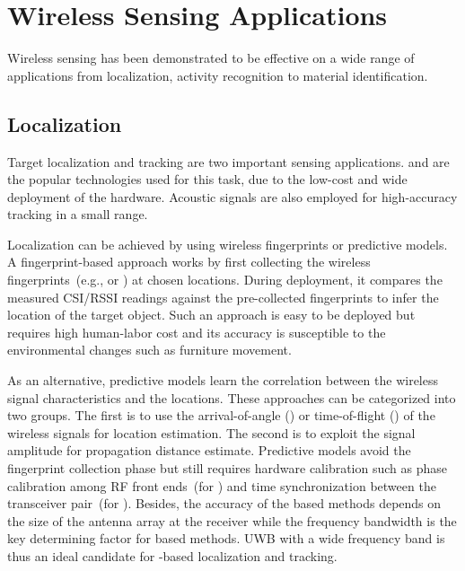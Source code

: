 \section{Wireless Sensing Applications}
Wireless sensing has been demonstrated to be effective on a wide range of applications from localization, activity recognition to material
identification.


\subsection{Localization} Target localization and tracking are two important sensing applications. \WiFi and \RFID are the popular technologies used for this task, due to the low-cost and wide deployment of the hardware.
Acoustic signals are also employed for high-accuracy tracking in a small range. %

Localization can be achieved by using wireless fingerprints or predictive models. A fingerprint-based approach works
by first collecting the wireless fingerprints~(e.g., \RSSI or \CSI) at chosen locations. During deployment, it compares the measured CSI/RSSI readings against the pre-collected fingerprints to infer the
location of the target object. Such an approach is easy to be deployed but requires high human-labor cost and its accuracy is susceptible to the environmental changes such as furniture movement.

As an alternative, predictive models learn the correlation between the wireless signal characteristics and the  locations. These
approaches can be categorized into two groups. The first is to use the arrival-of-angle (\AoA) or time-of-flight (\ToF) of the wireless
signals for location estimation. The second is to exploit the signal amplitude for propagation distance estimate. Predictive models avoid the fingerprint collection phase but still requires hardware calibration such as phase calibration among RF front ends~(for \AoA) and time synchronization between the transceiver pair~(for \ToF).  Besides, the accuracy of the \AoA based methods depends on the size of the antenna array at the receiver while the frequency bandwidth is the key determining factor for \ToF based methods. UWB with a wide frequency band is thus an ideal candidate for \ToF-based localization and tracking.     %

